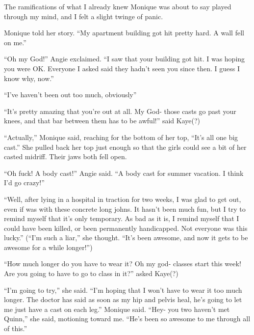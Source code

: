 The ramifications of what I already knew Monique was about to say played through my mind,
and I felt a slight twinge of panic.

Monique told her story. ``My apartment building got hit pretty hard. A wall fell on me.''

``Oh my God!'' Angie exclaimed. ``I saw that your building got hit. I was hoping you were OK.
Everyone I asked said they hadn't seen you since then. I guess I know why, now.''

``I've haven't been out too much, obviously''

``It's pretty amazing that you're out at all. My God- those casts go past your knees, and
that bar between them has to be awful!'' said Kaye(?)

``Actually,'' Monique said, reaching for the bottom of her top, ``It's all one big cast.'' She
pulled back her top just enough so that the girls could see a bit of her casted midriff. Their
jaws both fell open.

``Oh fuck! A body cast!'' Angie said. ``A body cast for summer vacation. I think I'd go
crazy!''

``Well, after lying in a hospital in traction for two weeks, I was glad to get out, even if
was with these concrete long johns. It hasn't been much fun, but I try to remind myself that
it's only temporary. As bad as it is, I remind myself that I could have been killed, or been
permanently handicapped. Not everyone was this lucky.'' (``I'm such a liar,'' she thought.
``It's
been awesome, and now it gets to be awesome for a while longer!'')

``How much longer do you have to wear it? Oh my god- classes start this week! Are you going
to have to go to class in it?'' asked Kaye(?)

``I'm going to try,'' she said. ``I'm hoping that I won't have to wear it too much longer. The
doctor has said as soon as my hip and pelvis heal, he's going to let me just have a cast on each
leg.'' Monique said. ``Hey- you two haven't met Quinn,'' she said, motioning toward me. ``He's
been
so awesome to me through all of this.''

